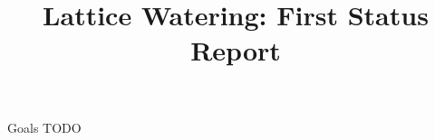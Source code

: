 \documentclass[10pt, xcolor=svgnames]{beamer}
\title{Lattice Watering: First Status Report}
\begin{document}
\maketitle

\begin{frame}{Goals}
    TODO
\end{frame}
\end{document}
